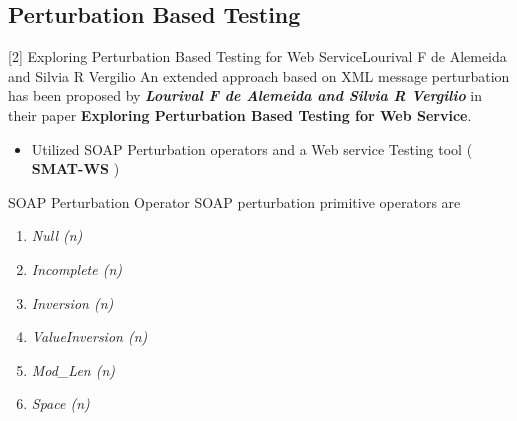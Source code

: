 \documentclass[10pt]{beamer}
\begin{document}
\subsection{Perturbation Based Testing}
\begin{frame}{[2] Exploring Perturbation Based Testing for Web Service}{Lourival F de Alemeida and Silvia R Vergilio}
	An extended approach based on XML message perturbation has been proposed by \textbf{\textit{Lourival F de Alemeida and Silvia R Vergilio}} in their paper \textbf{Exploring Perturbation Based Testing for Web Service}.
	\begin{itemize}
		\item  Utilized SOAP Perturbation operators and a Web service Testing tool (\textbf{ SMAT-WS })
	\end{itemize}
	 
  \begin{block}{SOAP Perturbation Operator}
    SOAP perturbation primitive operators are
    \begin{enumerate}
    \item  \textit{Null (n)}
    \item \textit{Incomplete (n)}
    \item \textit{Inversion (n)}
    \item \textit{ValueInversion (n)}
    \item \textit{Mod\_Len (n)}
    \item \textit{Space (n)}
    
    \end{enumerate}   
  \end{block}
\end{frame}
\end{document}
